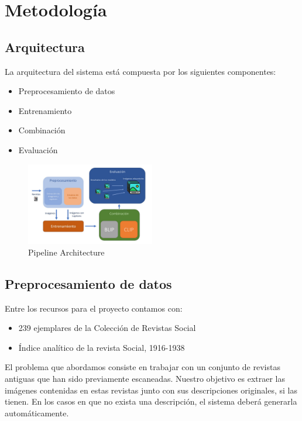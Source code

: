 \documentclass[14pt]{extarticle}
\begin{document}
\section{Metodología}

\subsection{Arquitectura}

La arquitectura del sistema está compuesta por los siguientes componentes:

\begin{itemize}
    \item Preprocesamiento de datos
    \item Entrenamiento
    \item Combinación
    \item Evaluación
\end{itemize}

\begin{figure}[h]
    \centering
    \includegraphics[width=0.5\textwidth]{./images/pipeline.jpg}
    \caption{Pipeline Architecture}
    \label{fig:pipeline}
\end{figure}

\subsection{Preprocesamiento de datos}

Entre los recursos para el proyecto contamos con:
\begin{itemize}
    \item 239 ejemplares de la Colección de Revistas Social
    \item Índice analítico de la revista Social, 1916-1938
\end{itemize}

El problema que abordamos consiste en trabajar con un conjunto de revistas antiguas que han sido previamente escaneadas. Nuestro objetivo es extraer las imágenes contenidas en estas revistas junto con sus descripciones originales, si las tienen. En los casos en que no exista una descripción, el sistema deberá generarla automáticamente.
\end{document}
